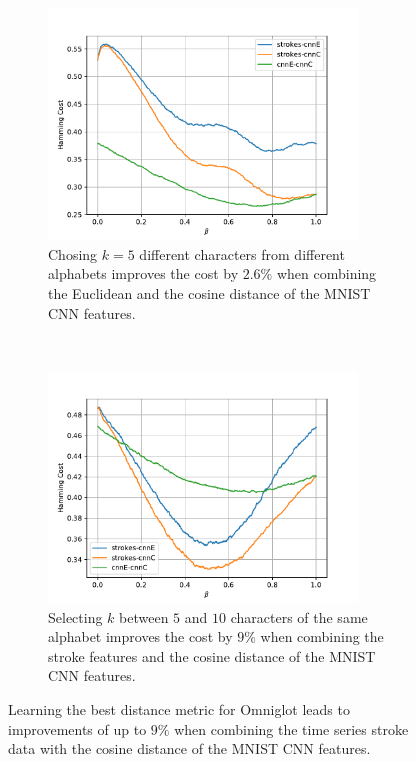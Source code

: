 \begin{figure}[H]
  \begin{subfigure}[b]{0.5\textwidth}
    \centering
    \includegraphics[width=0.9\textwidth]{plots/omniglot_MAML_results}
    \caption{Chosing $k=5$ different characters from different alphabets improves the cost by $2.6\%$ when combining the Euclidean and the cosine distance of the MNIST CNN features.}
    \label{fig:dl-omniglot-maml}
  \end{subfigure}\quad
  ~
  \begin{subfigure}[b]{0.5\textwidth}
    \centering
    \includegraphics[width=0.9\textwidth]{plots/omniglot_MD2_results}
    \caption{Selecting $k$ between $5$ and $10$ characters of the same alphabet improves the cost by $9\%$ when combining the stroke features and the cosine distance of the MNIST CNN features.}
    \label{fig:dl-omniglot-md}
  \end{subfigure}
  \caption{Learning the best distance metric for Omniglot leads to improvements of up to $9\%$ when combining the time series stroke data with the cosine distance of the MNIST CNN features.}
  \label{fig:dl-omniglot}
\end{figure}
